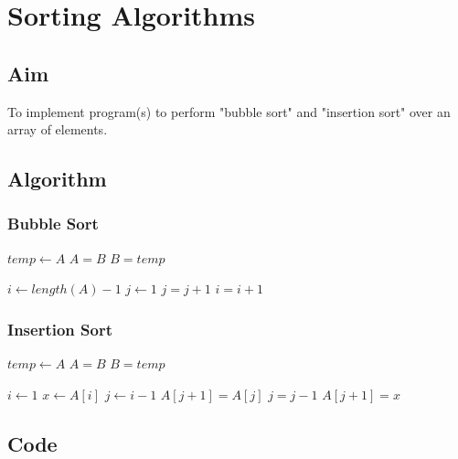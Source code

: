 \chapter{Sorting Algorithms}

\section{Aim}

{\Large\color{white}
To implement program(s) to perform "bubble sort" and "insertion sort" over an array of elements.
\color{black}}

\section{Algorithm}

\subsection{Bubble Sort}
{\Large\color{white}
\begin{algorithmic}[1]
		\State $temp \gets A$
		\State $A = B$
		\State $B = temp$
	\EndFunction

		\State $i \gets length(A) - 1$
			\State $j \gets 1$
					\State {}
				\EndIf
				\State $j = j + 1$
			\EndWhile
			\State $i = i + 1$
		\EndWhile
	\EndFunction
\end{algorithmic}
\color{black}}

\subsection{Insertion Sort}
{\Large\color{white}
\begin{algorithmic}[1]
		\State $temp \gets A$
		\State $A = B$
		\State $B = temp$
	\EndFunction

		\State $i \gets 1$
			\State $x \gets A[i]$
			\State $j \gets i-1$
				\State $A[j+1] = A[j]$
				\State $j = j - 1$
			\EndWhile
			\State $A[j+1] = x$
		\EndWhile
	\EndFunction
\end{algorithmic}
\color{black}}

\section{Code}

